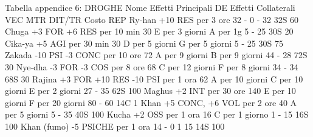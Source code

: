 Tabella appendice 6: DROGHE									
Nome	Effetti Principali	DE	Effetti Collaterali	VEC	MTR	DIT/TR	Costo	REP %
Ry-han	+10 RES per 3 ore	32	-	0	-	32	32S	60%
Chuga	+3 FOR +6 RES per 10 min	30	E per 3 giorni A per 1g	5	-	25	30S	20%
Cika-ya	+5 AGI per 30 min	30	D per 5 giorni G per 5 giorni	5	-	25	30S	75%
Zakada	-10 PSI -3 CONC per 10 ore	72	A per 9 giorni B per 9 giorni	44	-	28	72S	30%
Nye-dha	-3 FOR -3 COS per 8 ore	68	C per 12 giorni F per 8 giorni	34	-	34	68S	30%
Rajina	+3 FOR +10 RES -10 PSI per 1 ora	62	A per 10 giorni C per 10 giorni E per 2 giorni	27	-	35	62S	100 %
Maghus	+2 INT per 30 ore	140	E per 10 giorni F per 20 giorni	80	-	60	14C	1%
Khan	+5 CONC, +6 VOL per 2 ore	40	A per 5 giorni 	5	-	35	40S	100 %
Kucha	+2 OSS per 1 ora	16	C per 1 giorno 	1	-	15	16S	100%
Khan (fumo)	-5 PSICHE per 1 ora	14	-	0	1	15	14S	100 %
